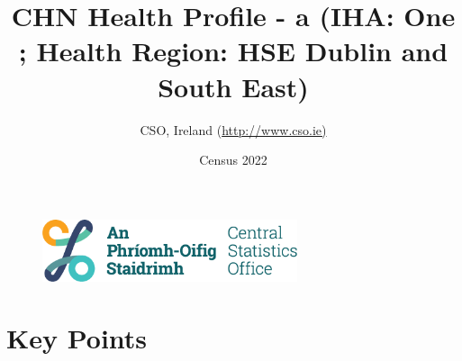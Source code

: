 \documentclass{article}
\title{CHN Health Profile - a (IHA: One ;  Health Region: HSE Dublin and South East) }
\date{Census 2022}
\author{CSO, Ireland  (\url{http://www.cso.ie)}}
\begin{document}


\begin{figure}
	\centering
\includegraphics[width =75mm]{../figures/CSO_Logo.png}
\end{figure}

				 
		   
						  
														  
																																													
												 
			 
\maketitle
					
													   
				 
						 
																																																																											   
				 
				  
  \pagebreak
    	    \tableofcontents

\pagebreak


\section{Key Points}
\end{document}
